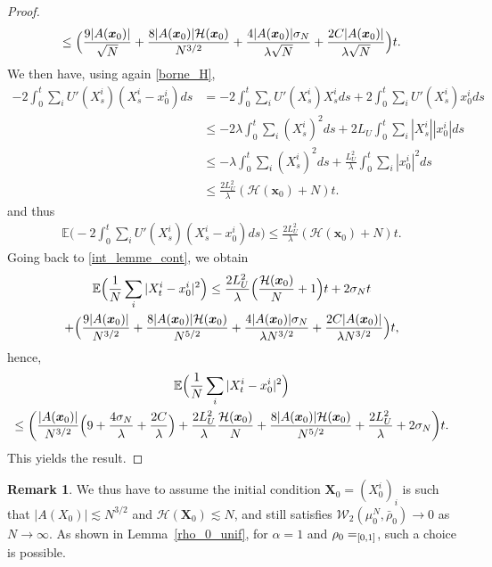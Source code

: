 \documentclass[11pt]{article}
\makeatletter
\DeclareRobustCommand{\mathbbm}[1]{\csname jepbb@#1\endcsname}
\let\mathds\mathbbm
\newcommand{\bx}{{\boldsymbol{x}}}
\newcommand{\bX}{{\boldsymbol{X}}}
\theoremstyle{plain}
\theoremstyle{definition}
\newtheorem{remark}{Remark}[section]
\makeatother
\begin{document}
\begin{proof}
\begin{multline*}
\leq \Bigl(\frac{9|A(\bx_0)|}{\sqrt{N}}+\frac{8|A(\bx_0)|\mathcal{H}(\bx_0)}{N^{3/2}}+\frac{4|A(\bx_0)|\sigma_N}{\lambda\sqrt{N}}+\frac{2C|A(\bx_0)|}{\lambda \sqrt{N}}\Bigr)t.
\end{multline*}
We then have, using again \eqref{borne_H},
\begin{align*}
-2 \int_0^t\sum_iU'(X^i_s)(X^i_s-x^i_0)ds&=-2\int_0^t\sum_iU'(X^i_s)X^i_sds+2\int_0^t\sum_iU'(X^i_s)x^i_0ds\\
&\leq -2\lambda\int_0^t\sum_i(X^i_s)^2ds+2L_U\int_0^t\sum_i|X^i_s||x^i_0|ds\\
&\leq -\lambda\int_0^t\sum_i(X^i_s)^2ds+\frac{L_U^2}{\lambda}\int_0^t\sum_i|x^i_0|^2ds\\
&\leq \frac{2L_U^2}{\lambda}(\mathcal{H}(\bx_0)+N)t.
\end{align*}
and thus
\begin{align*}
\mathbb{E}\biggl(-2\int_0^t\sum_iU'(X^i_s)(X^i_s-x^i_0)ds\biggr)\leq \frac{2L_U^2}{\lambda}(\mathcal{H}(\bx_0)+N)t.
\end{align*}
Going back to \eqref{int_lemme_cont}, we obtain
\begin{multline*}
\mathbb{E}\Bigl(\frac{1}{N}\sum_{i}|X^i_t-x^i_0|^2\Bigr)\leq \frac{2L_U^2}{\lambda}\Bigl(\frac{\mathcal{H}(\bx_0)}{N}+1\Bigr)t+2\sigma_N t\\
+\Bigl(\frac{9|A(\bx_0)|}{N^{3/2}}+\frac{8|A(\bx_0)|\mathcal{H}(\bx_0)}{N^{5/2}}+\frac{4|A(\bx_0)|\sigma_N}{\lambda N^{3/2}}+\frac{2C|A(\bx_0)|}{\lambda N^{3/2}}\Bigr)t,
\end{multline*}
hence,
\begin{multline*}
\mathbb{E}\Bigl(\frac{1}{N}\sum_{i}|X^i_t-x^i_0|^2\Bigr)\\
\leq \biggl(\frac{|A(\bx_0)|}{N^{3/2}}\Bigl(9+\frac{4\sigma_N}{\lambda}+\frac{2C}{\lambda}\Bigr)
+\frac{2L_U^2}{\lambda}\frac{\mathcal{H}(\bx_0)}{N}+\frac{8|A(\bx_0)|\mathcal{H}(\bx_0)}{N^{5/2}}+\frac{2L_U^2}{\lambda}+2\sigma_N\biggr)t.
\end{multline*}
This yields the result.
\end{proof}

\begin{remark}
We thus have to assume the initial condition $\bX_0=\left(X^i_0\right)_i$ is such that $|A(X_0)|\lesssim N^{3/2}$ and $\mathcal{H}(\bX_0)\lesssim N$, and still satisfies $\mathcal{W}_2(\mu^N_0,\bar{\rho}_0)\to0$ as $N\to\infty$. As shown in Lemma~\ref{rho_0_unif}, for $\alpha=1$ and $\rho_0=\mathds{1}_{[0,1]}$, such a choice is possible.
\end{remark}
\end{document}
